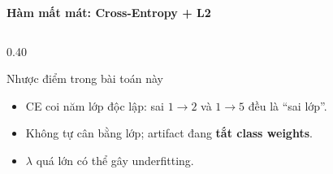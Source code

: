 \documentclass[aspectratio=169]{beamer}
\begin{document}
\begin{frame}{\textbf{\large Hàm mất mát: Cross-Entropy + L2}}
\begin{columns}[T,onlytextwidth]
\begin{column}{0.40\textwidth}
            \begin{alertblock}{Nhược điểm trong bài toán này}
                \begin{itemize}
                    \item CE coi năm lớp độc lập: sai $1\!\to\!2$ và
                    $1\!\to\!5$ đều là ``sai lớp''.
                    \item Không tự cân bằng lớp; artifact đang
                    \textbf{tắt class weights}.
                    \item $\lambda$ quá lớn có thể gây underfitting.
                \end{itemize}
            \end{alertblock}
        \end{column}
    \end{columns}
\end{frame}
\end{document}
